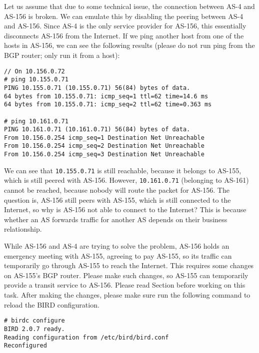 Let us assume that due to some technical issue, 
the connection between AS-4 and AS-156 is broken.  We can
emulate this by disabling the peering between AS-4 and AS-156.
Since AS-4 is the only service provider for AS-156, this essentially
disconnects AS-156 from the Internet. If we ping another host from
one of the hosts in AS-156, we can see the following results (please 
do not run ping from the BGP router; only run it from a host):

\begin{lstlisting}
// On 10.156.0.72
# ping 10.155.0.71
PING 10.155.0.71 (10.155.0.71) 56(84) bytes of data.
64 bytes from 10.155.0.71: icmp_seq=1 ttl=62 time=14.6 ms
64 bytes from 10.155.0.71: icmp_seq=2 ttl=62 time=0.363 ms

# ping 10.161.0.71
PING 10.161.0.71 (10.161.0.71) 56(84) bytes of data.
From 10.156.0.254 icmp_seq=1 Destination Net Unreachable
From 10.156.0.254 icmp_seq=2 Destination Net Unreachable
From 10.156.0.254 icmp_seq=3 Destination Net Unreachable
\end{lstlisting}
 
We can see that \texttt{10.155.0.71} is still reachable, because it
belongs to AS-155, which is still peered with AS-156. However,
\texttt{10.161.0.71} (belonging to AS-161) cannot be reached, because 
nobody will route the packet for AS-156.
The question is, AS-156 still peers with AS-155, 
which is still connected to the Internet, so why is AS-156 not able to 
connect to the Internet?  This is because whether an AS forwards 
traffic for another AS depends on their business relationship. 


While AS-156 and AS-4 are trying to solve the problem, AS-156 holds an 
emergency meeting with AS-155, agreeing to pay AS-155, so its 
traffic can temporarily go through AS-155 to reach the Internet. 
This requires some changes on AS-155's BGP router. 
Please make such changes, so AS-155 can temporarily 
provide a transit service to AS-156.
Please read Section \bigcommunity before working on this task. 
After making the changes, please make sure run the following 
command to reload the BIRD configuration.

\begin{lstlisting}
# birdc configure
BIRD 2.0.7 ready.
Reading configuration from /etc/bird/bird.conf
Reconfigured
\end{lstlisting}
 

 
